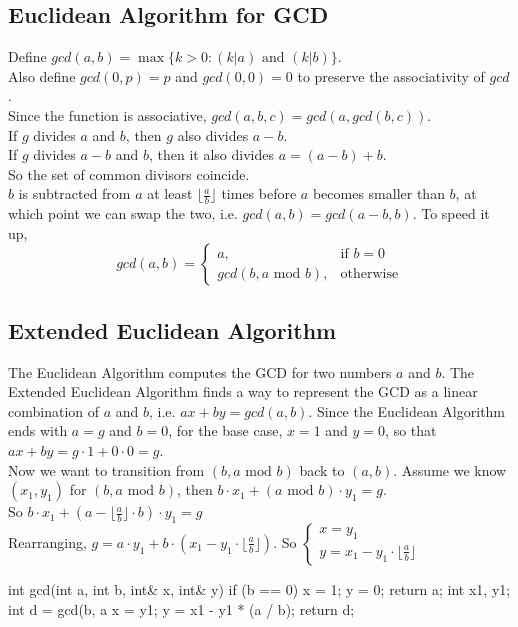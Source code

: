 \documentclass[12pt]{extarticle}
\begin{document}
\subsection*{Euclidean Algorithm for GCD}
Define $gcd(a,b)=\max\{k>0:(k|a)\text{ and }(k|b)\}$. \\
Also define $gcd(0,p)=p$ and $gcd(0,0)=0$ to preserve the associativity of $gcd$.\\
Since the function is associative, $gcd(a,b,c)=gcd(a,gcd(b,c))$.\\
If $g$ divides $a$ and $b$, then $g$ also divides $a-b$.\\
If $g$ divides $a-b$ and $b$, then it also divides $a=(a-b)+b$.\\
So the set of common divisors coincide.\\
$b$ is subtracted from $a$ at least $\lfloor\frac{a}{b}\rfloor$ times before $a$ becomes smaller than $b$, at which point we can swap the two, i.e. $gcd(a,b)=gcd(a-b,b)$. To speed it up, $$gcd(a,b)=\begin{cases}a, &\text{if }b=0\\gcd(b,a \text{ mod }b),&\text{otherwise} \end{cases}$$
\subsection*{Extended Euclidean Algorithm}
The Euclidean Algorithm computes the GCD for two numbers $a$ and $b$. The Extended Euclidean Algorithm finds a way to represent the GCD as a linear combination of $a$ and $b$, i.e. $ax+by=gcd(a,b)$. Since the Euclidean Algorithm ends with $a=g$ and $b=0$, for the base case, $x=1$ and $y=0$, so that $ax+by=g\cdot 1+0\cdot 0=g$.\\
Now we want to transition from $(b, a\text{ mod } b)$ back to $(a,b)$. Assume we know $(x_{1}, y_{1})$ for $(b, a\text{ mod } b)$, then $b\cdot x_{1}+(a \text{ mod }b )\cdot y_{1}=g$.\\
So $b\cdot x_{1}+(a-\lfloor\frac{a}{b}\rfloor\cdot b)\cdot y_{1}=g$\\
Rearranging, $g=a\cdot y_{1}+b\cdot(x_{1}-y_{1}\cdot\lfloor\frac{a}{b}\rfloor)$. So $\begin{cases}x=y_{1}\\ y=x_{1}-y_{1}\cdot\lfloor\frac{a}{b}\rfloor\end{cases}$

\begin{cpp}
int gcd(int a, int b, int& x, int& y) {
    if (b == 0) {
        x = 1;
        y = 0;
        return a;
    }
    int x1, y1;
    int d = gcd(b, a %
    x = y1;
    y = x1 - y1 * (a / b);
    return d;
}
\end{cpp}
\end{document}
